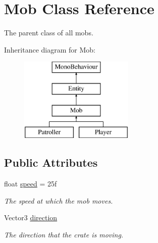 \hypertarget{class_mob}{}\section{Mob Class Reference}
\label{class_mob}


The parent class of all mobs.  


Inheritance diagram for Mob\+:\begin{figure}[H]
\begin{center}
\leavevmode
\includegraphics[height=4.000000cm]{class_mob}
\end{center}
\end{figure}
\subsection*{Public Attributes}
\begin{DoxyCompactItemize}
\item 
float \mbox{\hyperlink{class_mob_ae3126d5dea1c7abcbde5a73de0c1a791}{speed}} = 25f
\begin{DoxyCompactList}\small\item\em The speed at which the mob moves. \end{DoxyCompactList}\item 
Vector3 \mbox{\hyperlink{class_mob_a9e4730b2cbbb1230028177caf997a70e}{direction}}
\begin{DoxyCompactList}\small\item\em The direction that the crate is moving. \end{DoxyCompactList}\end{DoxyCompactItemize}
